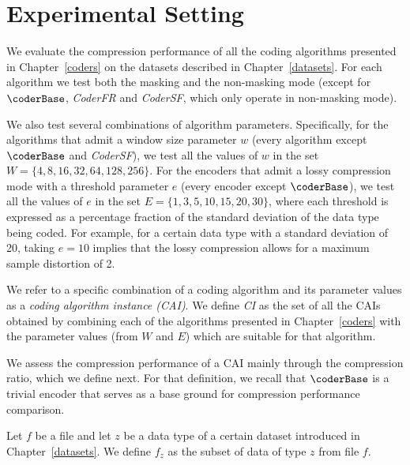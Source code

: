 \section{Experimental Setting}
\label{experiments:experiments}


We evaluate the compression performance of all the coding algorithms presented in Chapter~\ref{coders} on the datasets described in Chapter~\ref{datasets}. For each algorithm we test both the masking and the non-masking mode (except for $\coderBase$, \textit{CoderFR} and \textit{CoderSF}, which only operate in non-masking mode).


We also test several combinations of algorithm parameters. Specifically, for the algorithms that admit a window size parameter $w$ (every algorithm except $\coderBase$ and \textit{CoderSF}), we test all the values of $w$ in the set $W = \{4, 8, 16, 32, 64, 128, 256\}$. For the encoders that admit a lossy compression mode with a threshold parameter $e$ (every encoder except $\coderBase$), we test all the values of $e$ in the set $E= \{1, 3, 5, 10, 15, 20, 30\}$, where each threshold is expressed as a percentage fraction of the standard deviation of the data type being coded. For example, for a certain data type with a standard deviation of 20, taking $e=10$ implies that the lossy compression allows for a maximum sample distortion of 2.


\vspace{+5pt}
\begin{defcion}
We refer to a specific combination of a coding algorithm and its parameter values as a \textit{coding algorithm instance (CAI)}. We define \textit{CI} as the set of all the CAIs obtained by combining each of the algorithms presented in Chapter~\ref{coders} with the parameter values (from $W$ and $E$) which are suitable for that algorithm.
\end{defcion}


We assess the compression performance of a CAI mainly through the compression ratio, which we define next. For that definition, we recall that $\coderBase$ is a trivial encoder that serves as a base ground for compression performance comparison.


\clearpage


\begin{defcion}
Let $f$ be a file and let $z$ be a data type of a certain dataset introduced in Chapter~\ref{datasets}. We define $f_z$ as the subset of data of type $z$ from file $f$.
\end{defcion}


